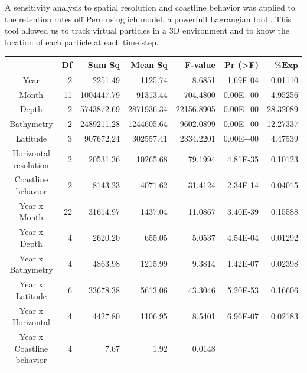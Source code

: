 A sensitivity analysis to spatial resolution and coastline behavior was applied to the retention rates off Peru using \gls{ich} model, a powerfull Lagrangian tool \citep{LettVerl2008}. This tool allowed us to track virtual particles in a 3D environment and to know the location of each particle at each time step.\\

\begin{table}[H]
\centering
\begin{adjustbox}{width=0.9\textwidth}
\small
\begin{tabular}{c|r|r|r|r|r|r}
\hline
								&
\textbf{Df}                   	&
\textbf{Sum Sq}               	&
\textbf{Mean Sq}              	&
\textbf{F-value}    		   	&
\textbf{Pr (\textgreater{F})}	&
$\mathbf{\% Exp}$				\\
\hline
Year		& 
2			& 
2251.49		& 
1125.74		& 
8.6851		& 
1.69E-04	& 
0.01110		\\
Month			& 
11				& 
1004447.79		& 
91313.44		& 
704.4800		& 
0.00E+00		& 
4.95256			\\
Depth		& 
2			& 
5743872.69	& 
2871936.34	& 
22156.8905	& 
0.00E+00	& 
28.32089	\\
Bathymetry		& 
2				& 
2489211.28		& 
1244605.64		& 
9602.0899		& 
0.00E+00		& 
12.27337		\\
Latitude	& 
3			& 
907672.24	& 
302557.41	& 
2334.2201	& 
0.00E+00	& 
4.47539		\\
Horizontal resolution	& 
2						& 
20531.36				& 
10265.68				& 
79.1994					& 
4.81E-35				& 
0.10123					\\
Coastline behavior	&
2					& 
8143.23				& 
4071.62				& 
31.4124				& 
2.34E-14			& 
0.04015				\\
Year x Month	& 
22				& 
31614.97		& 
1437.04			& 
11.0867			& 
3.40E-39		& 
0.15588			\\
Year x Depth		& 
4					& 
2620.20				& 
655.05				& 
5.0537				& 
4.54E-04			& 
0.01292				\\
Year x Bathymetry		& 
4						& 
4863.98					& 
1215.99					& 
9.3814					& 
1.42E-07				& 
0.02398					\\
Year x Latitude		& 
6					& 
33678.38			& 
5613.06				& 
43.3046				& 
5.20E-53			& 
0.16606				\\
Year x Horizontal		& 
4						& 
4427.80					& 
1106.95					& 
8.5401					& 
6.96E-07				& 
0.02183					\\
Year x Coastline behavior	& 
4							& 
7.67						& 
1.92						& 
0.0148						& 

\end{tabular}
\end{adjustbox}
\end{table}
